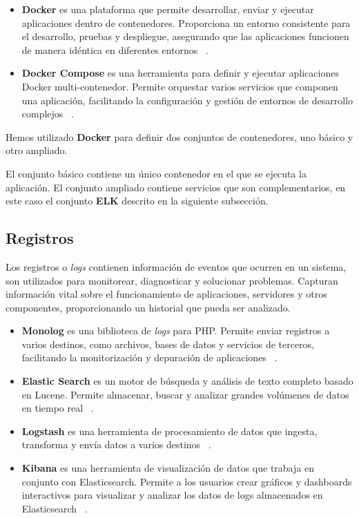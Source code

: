 \begin{itemize}
    \item \textbf{Docker} es una plataforma que permite desarrollar, enviar y ejecutar aplicaciones dentro de
    contenedores.
    Proporciona un entorno consistente para el desarrollo, pruebas y despliegue, asegurando que las aplicaciones
    funcionen de manera idéntica en diferentes entornos ~\cite{url_docker}.
    \item \textbf{Docker Compose} es una herramienta para definir y ejecutar aplicaciones Docker multi-contenedor.
    Permite orquestar varios servicios que componen una aplicación, facilitando la configuración y gestión de entornos
    de desarrollo complejos ~\cite{url_docker_compose}.
\end{itemize}

Hemos utilizado \textbf{Docker} para definir dos conjuntos de contenedores, uno básico y otro ampliado.

El conjunto básico contiene un único contenedor en el que se ejecuta la aplicación.
El conjunto ampliado contiene servicios que son complementarios, en este caso el conjunto \textbf{ELK} descrito en la
siguiente subsección.

\subsection*{Registros}\label{subsec:chapter_4.logs}

Los registros o \textit{logs} contienen información de eventos que ocurren en un sistema, son utilizados para
monitorear, diagnosticar y solucionar problemas.
Capturan información vital sobre el funcionamiento de aplicaciones, servidores y otros componentes, proporcionando un
historial que pueda ser analizado.

\begin{itemize}
    \item \textbf{Monolog} es una biblioteca de \textit{logs} para PHP. Permite enviar registros a varios destinos, como
    archivos, bases de datos y servicios de terceros, facilitando la monitorización y depuración de aplicaciones
    ~\cite{url_monolog}.
    \item \textbf{Elastic Search} es un motor de búsqueda y análisis de texto completo basado en Lucene.
    Permite almacenar, buscar y analizar grandes volúmenes de datos en tiempo real
    ~\cite{url_elasticsearch}.
    \item \textbf{Logstash} es una herramienta de procesamiento de datos que ingesta, transforma y envía datos a varios
    destinos ~\cite{url_logstash}.
    \item \textbf{Kibana} es una herramienta de visualización de datos que trabaja en conjunto con Elasticsearch.
    Permite a los usuarios crear gráficos y dashboards interactivos para visualizar y analizar los datos de logs
    almacenados en Elasticsearch ~\cite{url_kibana}.
\end{itemize}

